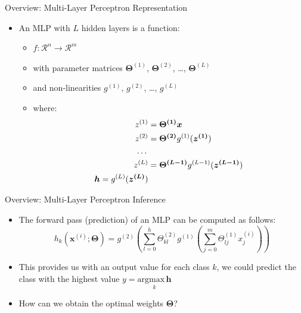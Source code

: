 \begin{frame}{Overview: Multi-Layer Perceptron Representation}{}
	\begin{itemize}
		\item An MLP with $L$ hidden layers is a function:
		\begin{itemize}
			\item $f: \mathcal{R}^n \rightarrow \mathcal{R}^m$
			\item with parameter matrices $\bm{\Theta}^{(1)}$, $\bm{\Theta}^{(2)}$, \dots, $\bm{\Theta}^{(L)}$
			\item and non-linearities $g^{(1)}$, $g^{(2)}$, \dots, $g^{(L)}$
			\item where:
			\begin{align*}
				z^{(1)} &= \bm{\Theta^{(1)}} \bm{x}\\
				z^{(2)} &= \bm{\Theta^{(2)}} g^{(1)}(\bm{z^{(1)}})\\
				\text{\dots}\\
				z^{(L)} &= \bm{\Theta^{(L-1)}} g^{(L-1)}(\bm{z^{(L-1)}})\\
				\bm{h} = g^{(L)}(\bm{z^{(L)}})
			\end{align*}
		\end{itemize}
	\end{itemize}
\end{frame}

\begin{frame}{Overview: Multi-Layer Perceptron Inference}{}
	\begin{itemize}
		\item The forward pass (prediction) of an MLP can be computed as follows:
		$$h_k(\bm{x}^{(i)}; \bm{\Theta}) = g^{(2)}\left( \sum_{l=0}^h \Theta_{kl}^{(2)} g^{(1)}\left( \sum_{j=0}^m \Theta_{lj}^{(1)} x_{j}^{(i)} \right) \right)$$
		\item This provides us with an output value for each class $k$, we could predict the class with the highest value $y = \underset{k}{\text{argmax}\,\bm{h}}$
		\item How can we obtain the optimal weights $\bm{\Theta}$?
	\end{itemize}
\end{frame}

